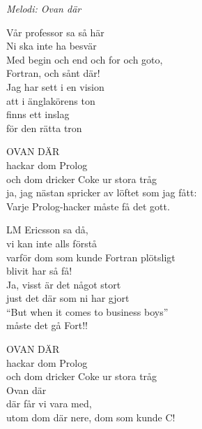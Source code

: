 {\footnotesize\textit{Melodi: Ovan där}}\par
\vspace{10pt}
Vår professor sa så här\\
Ni ska inte ha besvär\\
Med begin och end och for och goto,\\
Fortran, och sånt där!\\
Jag har sett i en vision\\
att i änglakörens ton\\
finns ett inslag\\
för den rätta tron\par
\vspace{7pt}
OVAN DÄR\\
hackar dom Prolog\\
och dom dricker Coke ur stora tråg\\
ja, jag nästan spricker av löftet som jag fått:\\
Varje Prolog-hacker måste få det gott.\par
\vspace{7pt}
LM Ericsson sa då,\\
vi kan inte alls förstå\\
varför dom som kunde Fortran plötsligt\\
blivit har så få!\\
Ja, visst är det något stort\\
just det där som ni har gjort\\
``But when it comes to business boys''\\
måste det gå Fort!!\par
\vspace{7pt}
OVAN DÄR\\
hackar dom Prolog\\
och dom dricker Coke ur stora tråg\\
Ovan där\\
där får vi vara med,\\
utom dom där nere, dom som kunde C!
